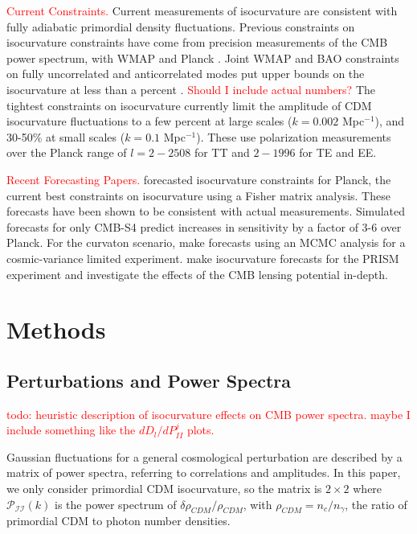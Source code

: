 \documentclass{emulateapj}
\newcommand\writingnote[1]{\textcolor{red}{#1}}
\newcommand\pii{ \mathcal{P}_{\mathcal{I}\mathcal{I}} }
\begin{document}
\writingnote{Current Constraints.}
Current measurements of isocurvature are consistent with fully adiabatic primordial density fluctuations. Previous constraints on isocurvature constraints have come from precision measurements of the CMB power spectrum, with WMAP \citep{moodley/etal:2004} and Planck \citep{planckXXII:2013}. Joint WMAP and BAO constraints on fully uncorrelated and anticorrelated modes put upper bounds on the isocurvature at less than a percent \citep{hinshaw/etal:2013}. \writingnote{Should I include actual numbers?} The tightest constraints on isocurvature \citep{planckXX:2015} currently limit the amplitude of CDM isocurvature fluctuations to a few percent at large scales ($k=0.002$ Mpc$^{-1}$), and 30-50\% at small scales ($k=0.1$ Mpc$^{-1}$). These use polarization measurements over the Planck range of $l=2-2508$ for TT and $2-1996$ for TE and EE. 


\writingnote{Recent Forecasting Papers.} 
\cite{bucher/etal:2001} forecasted isocurvature constraints for Planck, the current best constraints on isocurvature using a Fisher matrix analysis. These forecasts have been shown to be consistent with actual measurements. Simulated forecasts for only CMB-S4 \citep{CMB-S4:2016} predict increases in sensitivity by a factor of 3-6 over Planck. For the curvaton scenario, \cite{smith/grin:2016} make forecasts using an MCMC analysis for a cosmic-variance limited experiment. \cite{kasanda/moodley:2014} make isocurvature forecasts for the PRISM experiment and investigate the effects of the CMB lensing potential in-depth.



\section{Methods}


\subsection{Perturbations and Power Spectra}

\writingnote{
todo: heuristic description of isocurvature effects on CMB power spectra. maybe I include something like the $dD_l/dP_{II}^j$ plots.
}


Gaussian fluctuations for a general cosmological perturbation are described by a matrix of power spectra, referring to correlations and amplitudes. In this paper, we only consider primordial CDM isocurvature, so the matrix is $2 \times 2$ where $\pii(k)$ is the power spectrum of $\delta \rho_{CDM} / \rho_{CDM}$, with $\rho_{CDM} = n_c / n_{\gamma}$, the ratio of primordial CDM to photon number densities.
\end{document}
